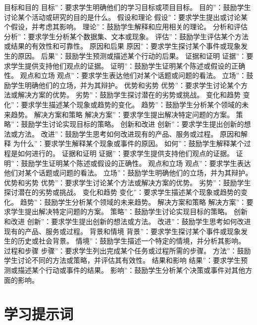 \documentclass[12pt]{book}
\begin{document}
目标和目的
目标”：要求学生明确他们的学习目标或项目目标。
目的”：鼓励学生讨论某个活动或研究的目的是什么。
假设和理论
假设”：要求学生提出或讨论某个假设，并考虑其影响。
理论”：鼓励学生解释和应用相关的理论。
分析和评估
分析”：要求学生分析某个数据集、文本或现象。
评估”：鼓励学生评估某个方法或结果的有效性和可靠性。
原因和后果
原因”：要求学生探讨某个事件或现象发生的原因。
后果”：鼓励学生预测或描述某个行动的后果。
证据和证明
证据”：要求学生提供支持他们观点的证据。
证明”：鼓励学生证明某个陈述或假设的正确性。
观点和立场
观点”：要求学生表达他们对某个话题或问题的看法。
立场”：鼓励学生明确他们的立场，并为其辩护。
优势和劣势
优势”：要求学生讨论某个方法或解决方案的优势。
劣势”：鼓励学生探讨潜在的劣势或挑战。
变化和趋势
变化”：要求学生描述某个现象或趋势的变化。
趋势”：鼓励学生分析某个领域的未来趋势。
解决方案和策略
解决方案”：要求学生提出解决特定问题的方案。
策略”：鼓励学生讨论实现目标的策略。
创新和改进
创新”：要求学生提出创新的想法或方法。
改进”：鼓励学生思考如何改进现有的产品、服务或过程。
原因和解释
为什么”：要求学生解释某个现象或事件的原因。
如何”：鼓励学生解释某个过程是如何进行的。
证据和证明
证据”：要求学生提供支持他们观点的证据。
证明”：鼓励学生证明某个陈述或假设的正确性。
观点和立场
观点”：要求学生表达他们对某个话题或问题的看法。
立场”：鼓励学生明确他们的立场，并为其辩护。
优势和劣势
优势”：要求学生讨论某个方法或解决方案的优势。
劣势”：鼓励学生探讨潜在的劣势或挑战。
变化和趋势
变化”：要求学生描述某个现象或趋势的变化。
趋势”：鼓励学生分析某个领域的未来趋势。
解决方案和策略
解决方案”：要求学生提出解决特定问题的方案。
策略”：鼓励学生讨论实现目标的策略。
创新和改进
创新”：要求学生提出创新的想法或方法。
改进”：鼓励学生思考如何改进现有的产品、服务或过程。
背景和情境
背景”：要求学生探讨某个事件或现象发生的历史或社会背景。
情境”：鼓励学生描述一个特定的情境，并分析其影响。
过程和步骤
步骤”：要求学生列出完成某个任务或过程所需的步骤。
方法”：鼓励学生讨论不同的方法或策略，并评估其有效性。
结果和影响
结果”：要求学生预测或描述某个行动或事件的结果。
影响”：鼓励学生分析某个决策或事件对其他方面的影响。

\chapter{学习提示词}
\end{document}
